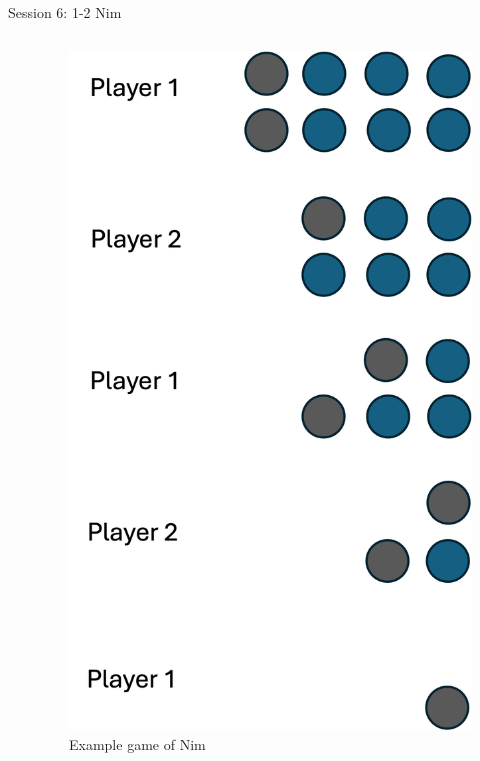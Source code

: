 \documentclass{beamer}  %
\begin{document}
\begin{frame}{Session 6: 1-2 Nim}
\begin{columns}
\begin{itemize}
            \end{itemize}
        \begin{figure}
            \includegraphics[scale = 0.4]{Images/Nim_example.png}
            \caption{Example game of Nim}
        \end{figure}
    \end{columns}
\end{frame}
\end{document}
